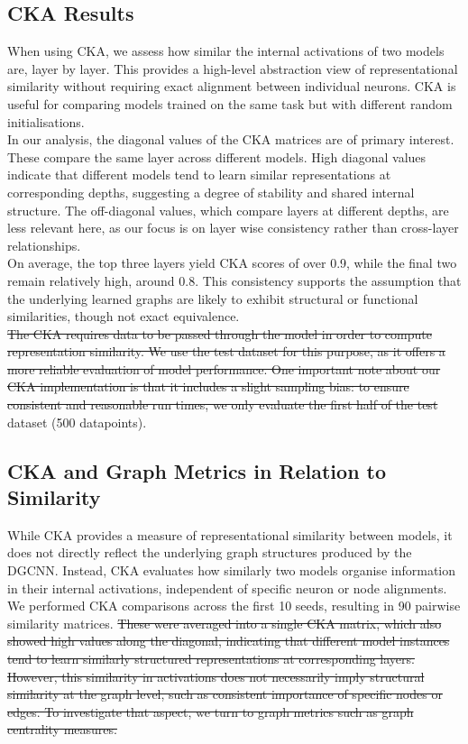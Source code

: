 \subsection{CKA Results}
When using CKA, we assess how similar the internal activations of two models are, layer by layer. This provides a high-level abstraction view of representational similarity without requiring exact alignment between individual neurons. CKA is useful for comparing models trained on the same task but with different random initialisations.
\vspace{0.5em}\\
In our analysis, the diagonal values of the CKA matrices are of primary interest. These compare the same layer across different models. High diagonal values indicate that different models tend to learn similar representations at corresponding depths, suggesting a degree of stability and shared internal structure. The off-diagonal values, which compare layers at different depths, are less relevant here, as our focus is on layer wise consistency rather than cross-layer relationships.
\vspace{0.5em}\\
On average, the top three layers yield CKA scores of over 0.9, while the final two remain relatively high, around 0.8. This consistency supports the assumption that the underlying learned graphs are likely to exhibit structural or functional similarities, though not exact equivalence. 
\vspace{0.5em}\\
\sout{The CKA requires data to be passed through the model in order to compute representation similarity. We use the test dataset for this purpose, as it offers a more reliable evaluation of model performance. One important note about our CKA implementation is that it includes a slight sampling bias: to ensure consistent and reasonable run times, we only evaluate the first half of the test }dataset (500 datapoints).
\subsection{CKA and Graph Metrics in Relation to Similarity}
While CKA provides a measure of representational similarity between models, it does not directly reflect the underlying graph structures produced by the DGCNN. Instead, CKA evaluates how similarly two models organise information in their internal activations, independent of specific neuron or node alignments. We performed CKA comparisons across the first 10 seeds, resulting in 90 pairwise similarity matrices. \sout{These were averaged into a single CKA matrix, which also showed high values along the diagonal, indicating that different model instances tend to learn similarly structured representations at corresponding layers. However, this similarity in activations does not necessarily imply structural similarity at the graph level, such as consistent importance of specific nodes or edges. To investigate that aspect, we turn to graph metrics such as graph centrality measures. }
